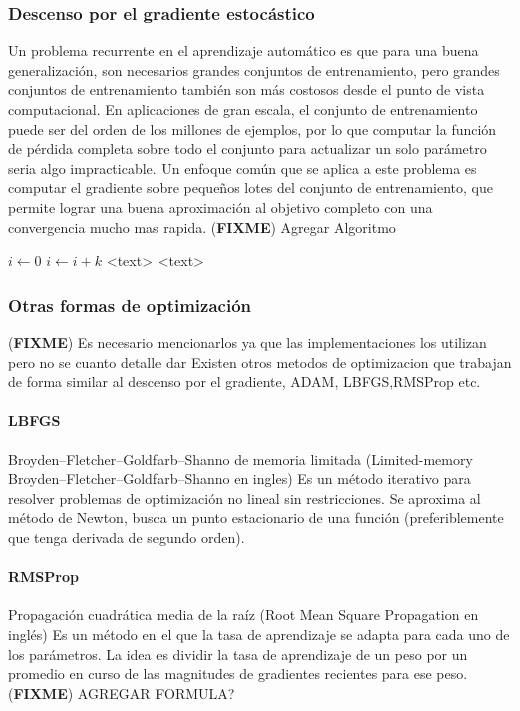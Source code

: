 \documentclass[a4paper,11pt,spanish]{book}
\newcommand*{\FIXME}[1]{{(\textbf{FIXME}) {#1}}}
\begin{document}
      \subsubsection{Descenso por el gradiente estocástico}
	Un problema recurrente en el aprendizaje automático es que para una buena generalización, son necesarios grandes conjuntos de entrenamiento, 
	pero grandes conjuntos de entrenamiento también son más costosos desde el punto de vista computacional.
	En aplicaciones de gran escala, el conjunto de entrenamiento puede ser del orden de los millones de ejemplos, por lo que computar la función de 
	pérdida completa sobre todo el conjunto para actualizar un solo parámetro seria algo impracticable.
	Un enfoque común que se aplica a este problema es computar el gradiente sobre pequeños lotes del conjunto de entrenamiento, 
	que permite lograr una buena aproximación al objetivo completo con una convergencia mucho mas rapida.
	\FIXME{Agregar Algoritmo}
		  \begin{algorithmic}
		\State $i\gets 0$
	    \Else
		    \State $i\gets i+k$
		\EndIf
	    \EndIf
	     <text> \EndFor
	     <text> \EndFor
	  \end{algorithmic}
	  

      \subsubsection{Otras formas de optimización}
	\FIXME{Es necesario mencionarlos ya que las implementaciones los utilizan pero no se cuanto detalle dar}
	Existen otros metodos de optimizacion que trabajan de forma similar al descenso por el gradiente, ADAM, LBFGS,RMSProp etc. 
	\paragraph{LBFGS} Broyden–Fletcher–Goldfarb–Shanno de memoria limitada (Limited-memory  Broyden–Fletcher–Goldfarb–Shanno en ingles) Es un método iterativo para resolver problemas de optimización 
	no lineal sin restricciones. Se aproxima al método de Newton,  busca un punto estacionario de una función (preferiblemente que tenga derivada de segundo orden). 
	\paragraph{RMSProp} Propagación cuadrática media de la raíz (Root Mean Square Propagation en inglés) Es un método en el que la tasa de aprendizaje se adapta para cada uno de los parámetros. 
	  La idea es dividir la tasa de aprendizaje de un peso por un promedio en curso de las magnitudes de gradientes recientes para ese peso.
	  \FIXME{AGREGAR FORMULA?}
\end{document}
